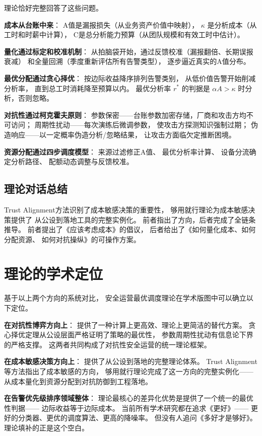 \documentclass[11pt,a4paper]{article}
\begin{document}
理论恰好完整回答了这些问题。

\textbf{成本从台账中来}：
A值是漏报损失（从业务资产价值中映射），
\(\kappa\) 是分析成本（从工时和时薪中计算），
C是总分析能力预算（从团队规模和有效工时中估计）。

\textbf{量化通过标定和校准机制}：
从拍脑袋开始，通过反馈校准（漏报翻倍、长期误报衰减）
和全量回溯（季度重新评估所有告警类型），
逐步逼近真实的A值分布。

\textbf{最优分配通过贪心择优}：
按边际收益降序排列告警类别，
从低价值告警开始削减分析率，
直到总工时消耗降至预算以内。
最优分析率 \(r^*\) 的判据是
\(\alpha A > \kappa\) 时分析，否则忽略。

\textbf{对抗性通过柯克霍夫原则}：
参数保密——台账参数加密存储，厂商和攻击方均不可访问；
周期性扰动——每次演练后微调参数，
使攻击方探测知识强制过期；
伪造响应——以一定概率伪造分析/忽略结果，
让攻击方面临欠定推断困境。

\textbf{资源分配通过四步调度模型}：
来源过滤修正A值、
最优分析率计算、
设备分流确定分析路径、
配额动态调整与反馈校准。

\subsection{理论对话总结}

Trust Alignment方法识别了成本敏感决策的重要性，
够用就行理论为成本敏感决策提供了
从公设到落地工具的完整实例化。
前者指出了方向，后者完成了全链条推导。
前者提出了《应该考虑成本》的倡议，
后者给出了《如何量化成本、如何分配资源、
如何对抗操纵》的可操作方案。

\section{理论的学术定位}

基于以上两个方向的系统对比，
安全运营最优调度理论在学术版图中可以确立以下定位。

\textbf{在对抗性博弈方向上}：
提供了一种计算上更高效、理论上更简洁的替代方案。
贪心择优定理从公设层面严格证明了策略的最优性，
参数周期性扰动有信息论下界的严格支撑。
这两者共同构成了对抗性安全运营的统一理论框架。

\textbf{在成本敏感决策方向上}：
提供了从公设到落地的完整理论体系。
Trust Alignment等方法指出了成本敏感的方向，
够用就行理论完成了这一方向的完整实例化——
从成本量化到资源分配到对抗防御到工程落地。

\textbf{在告警优先级排序领域整体}：
理论最核心的差异化优势是提供了一个统一的最优性判据——
边际收益等于边际成本。
当前所有学术研究都在追求《更好》——
更好的分类器、更优的调度算法、更高的降噪率。
但没有人追问《多好才是够好》。
理论填补的正是这个空白。
\end{document}
